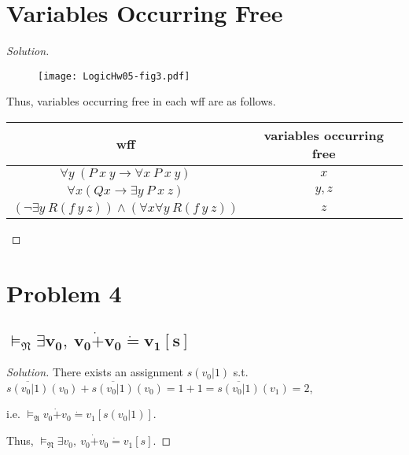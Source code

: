 \documentclass{article}
\newenvironment{solution}{\begin{proof}[\noindent\it Solution]}{\end{proof}}
\begin{document}
\vspace{1em}
\section{Variables Occurring Free}
\vspace{1em}
\begin{solution}
    \quad

    \vspace{-2.5em}
    \begin{figure}[htbp]
        \centering
        \texttt{[image: LogicHw05-fig3.pdf]}        
    \end{figure}

    \vspace{-1em} \hspace{2.6em}
    Thus, variables occurring free in each wff are as follows.

    \vspace{0.5em}
    \begin{table}[htbp]
        \centering
        \begin{tabular}{c|c}
            \hline
            wff & variables occurring free \\
            \hline
            $\forall y\ (P\ x\ y\to\forall x\ P\ x\ y)$ & $x$ \\
            $\forall x (Q x\to \exists y\ P\ x\ z)$ & $y,z$ \\
            $(\neg\exists y\ R(f\ y\ z))\land(\forall x\forall y\ R(f\ y\ z))$ & $z$ \\
            \hline
        \end{tabular}
    \end{table}

    \vspace{-3em}
\end{solution}

\newpage
\section{Problem 4}
\vspace{1em}
\subsection{$\boldsymbol{\vDash_{\mathfrak{N}} \exists v_0,\ v_0\dot{+}v_0\dot{=}v_1[s]}$}
\begin{solution}
    There exists an assignment $s(v_0|1)$ s.t. $\overline{s(v_0|1)}(v_0)+\overline{s(v_0|1)}(v_0)=1+1=\overline{s(v_0|1)}(v_1)=2$, 
    
    \hspace{6em}
    i.e. $\vDash_\mathfrak{A} v_0\dot{+}v_0\dot{=}v_1[s(v_0|1)]$.

    \hspace{2.6em}
    Thus, $\vDash_{\mathfrak{N}} \exists v_0,\ v_0\dot{+}v_0\dot{=}v_1[s]$.
\end{solution}
\end{document}
